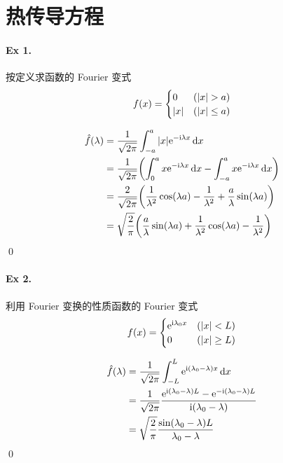 \section{热传导方程}
\paragraph{Ex 1.}
按定义求函数的 Fourier 变式
\[
f(x) = \begin{cases}0 & ({\lvert {x} \rvert} > a) \\ {\lvert {x} \rvert} & ({\lvert {x} \rvert} \leq a) \end{cases}
\]

\begin{solution}
\begin{align*}
\hat f(\lambda) &= \frac1{\sqrt{2\pi}} \int_{-a}^a
 {\lvert {x} \rvert} {\mathrm e}^{-{\mathrm i} \lambda x} \operatorname{d\!} x \\
&= \frac1{\sqrt{2\pi}} \biggl( \int_0^a x {\mathrm e}^{-{\mathrm i} \lambda x} \operatorname{d\!} x
    -\int_{-a}^a x {\mathrm e}^{-{\mathrm i} \lambda x} \operatorname{d\!} x \biggr) \\
&= \frac{2}{\sqrt{2\pi}} \biggl( \frac1{\lambda^2} \cos (\lambda a)
    - \frac1{\lambda^2} +\frac{a}{\lambda} \sin (\lambda a) \biggr) \\
&= \sqrt{\frac{2}{\pi}} \biggl( \frac{a}{\lambda} \sin (\lambda a)
    + \frac1{\lambda^2} \cos (\lambda a) - \frac1{\lambda^2} \biggr)
\end{align*}
\qed
\end{solution}
\paragraph{Ex 2.}
利用 Fourier 变换的性质函数的 Fourier 变式
\[
f(x)=\begin{cases}{\mathrm e}^{{\mathrm i} \lambda_0 x}&({\lvert {x} \rvert}< L)\\0&({\lvert {x} \rvert}\geq L)\end{cases}
\]

\begin{solution}
\begin{align*}
\hat f(\lambda) &= \frac1{\sqrt{2\pi}} \int_{-L}^L
    {\mathrm e}^{{\mathrm i} (\lambda_0 - \lambda) x} \operatorname{d\!} x \\
&= \frac1{\sqrt{2\pi}} \frac{{\mathrm e}^{{\mathrm i} (\lambda_0 - \lambda) L} 
    - {\mathrm e}^{-{\mathrm i} (\lambda_0 - \lambda) L}}{{\mathrm i} (\lambda_0 - \lambda)} \\
&= \sqrt{\frac{2}{\pi}} \frac{\sin(\lambda_0 - \lambda) L}{\lambda_0 - \lambda}
\end{align*}
\qed
\end{solution}

